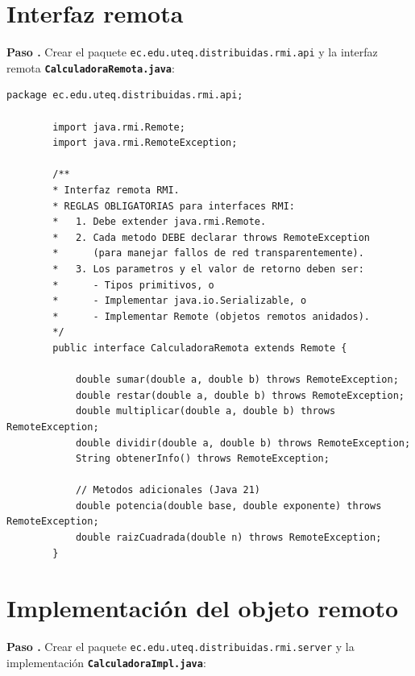 \documentclass[12pt, a4paper, openany]{book}
\newcounter{paso}[section]
\newcommand{\paso}[1]{%
	\stepcounter{paso}%
	\medskip\noindent
	\begin{tcolorbox}[enhanced, colback=white, colframe=practiceBlue,
		boxrule=0.8pt, arc=3pt, left=6pt, right=6pt, top=4pt, bottom=4pt,
		before upper={\noindent}]
		\textcolor{practiceBlue}{\textbf{Paso \arabic{paso}.}} #1
	\end{tcolorbox}%
}
\newcommand{\code}[1]{\texttt{\small#1}}
\newcommand{\archivo}[1]{\texttt{\textbf{#1}}}
\begin{document}
	\section{Interfaz remota}
	
	\paso{Crear el paquete \code{ec.edu.uteq.distribuidas.rmi.api} y la
		interfaz remota \archivo{CalculadoraRemota.java}:}
	
	\begin{lstlisting}[style=JavaStyle, caption={CalculadoraRemota.java --- Interfaz del objeto remoto}]
		package ec.edu.uteq.distribuidas.rmi.api;
		
		import java.rmi.Remote;
		import java.rmi.RemoteException;
		
		/**
		* Interfaz remota RMI.
		* REGLAS OBLIGATORIAS para interfaces RMI:
		*   1. Debe extender java.rmi.Remote.
		*   2. Cada metodo DEBE declarar throws RemoteException
		*      (para manejar fallos de red transparentemente).
		*   3. Los parametros y el valor de retorno deben ser:
		*      - Tipos primitivos, o
		*      - Implementar java.io.Serializable, o
		*      - Implementar Remote (objetos remotos anidados).
		*/
		public interface CalculadoraRemota extends Remote {
			
			double sumar(double a, double b) throws RemoteException;
			double restar(double a, double b) throws RemoteException;
			double multiplicar(double a, double b) throws RemoteException;
			double dividir(double a, double b) throws RemoteException;
			String obtenerInfo() throws RemoteException;
			
			// Metodos adicionales (Java 21)
			double potencia(double base, double exponente) throws RemoteException;
			double raizCuadrada(double n) throws RemoteException;
		}
	\end{lstlisting}
	
	\section{Implementación del objeto remoto}
	
	\paso{Crear el paquete \code{ec.edu.uteq.distribuidas.rmi.server} y la implementación \archivo{CalculadoraImpl.java}:}
	
\end{document}
